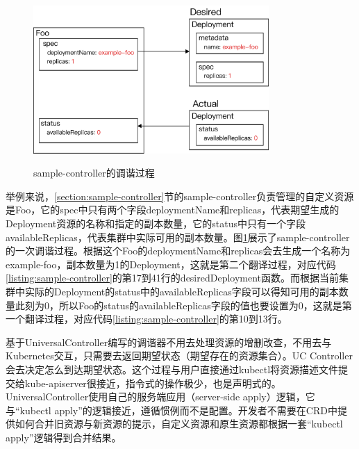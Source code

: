 \documentclass[macfonts,master]{njuthesis}
\begin{document}
\begin{figure}[htbp]
  \centering
  \includegraphics[width=0.8\textwidth]{pics/Foo-reconciliation.pdf}\\
  \caption{sample-controller的调谐过程}\label{fig:Foo-reconciliation}
\end{figure}

举例来说，\ref{section:sample-controller}节的sample-controller负责管理的自定义资源是Foo，它的spec中只有两个字段deploymentName和replicas，代表期望生成的Deployment资源的名称和指定的副本数量，它的status中只有一个字段availableReplicas，代表集群中实际可用的副本数量。图\ref{fig:Foo-reconciliation}展示了sample-controller的一次调谐过程。根据这个Foo的deploymentName和replicas会去生成一个名称为example-foo，副本数量为1的Deployment，这就是第二个翻译过程，对应代码\ref{listing:sample-controller}的第17到41行的desiredDeployment函数。而根据当前集群中实际的Deployment的status中的availableReplicas字段可以得知可用的副本数量此刻为0，所以Foo的status的availableReplicas字段的值也要设置为0，这就是第一个翻译过程，对应代码\ref{listing:sample-controller}的第10到13行。

基于UniversalController编写的调谐器不用去处理资源的增删改查，不用去与Kubernetes交互，只需要去返回期望状态（期望存在的资源集合）。UC Controller会去决定怎么到达期望状态。这个过程与用户直接通过kubectl将资源描述文件提交给kube-apiserver很接近，指令式的操作极少，也是声明式的。UniversalController使用自己的服务端应用（server-side apply）逻辑，它与``kubectl apply''的逻辑接近，遵循惯例而不是配置。开发者不需要在CRD中提供如何合并旧资源与新资源的提示，自定义资源和原生资源都根据一套``kubectl apply''逻辑得到合并结果。
\end{document}
